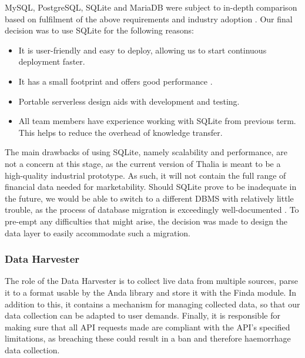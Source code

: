 \documentclass[main.tex]{subfiles}
\begin{document}
MySQL, PostgreSQL, SQLite and MariaDB were subject to in-depth comparison based on fulfilment of the above requirements and industry adoption \cite{dbPerfComparison} \cite{dbmsMarketShare}. Our final decision was to use SQLite for the following reasons:
\begin{itemize}
    \item It is user-friendly and easy to deploy, allowing us to start continuous deployment faster.
    \item It has a small footprint and offers good performance \cite{dbPerfComparison}.
    \item Portable serverless design aids with development and testing.
    \item All team members have experience working with SQLite from previous term. This helps to reduce the overhead of knowledge transfer.
\end{itemize}

The main drawbacks of using SQLite, namely scalability and performance, are not a concern at this stage, as the current version of Thalia is meant to be a high-quality industrial prototype. As such, it will not contain the full range of financial data needed for marketability. Should SQLite prove to be inadequate in the future, we would be able to switch to a different DBMS with relatively little trouble, as the process of database migration is exceedingly well-documented \cite{frameworkDataMigration} \cite{understandingDataMigration}. To pre-empt any difficulties that might arise, the decision was made to design the data layer to easily accommodate such a migration.


\subsubsection{Data Harvester}
\label{Data Harvester}

The role of the Data Harvester is to collect live data from multiple sources, parse it to a format usable by the Anda library and store it with the Finda module. In addition to this, it contains a mechanism for managing collected data, so that our data collection can be adapted to user demands. Finally, it is responsible for making sure that all API requests made are compliant with the API's specified limitations, as breaching these could result in a ban and therefore haemorrhage data collection.
\end{document}
